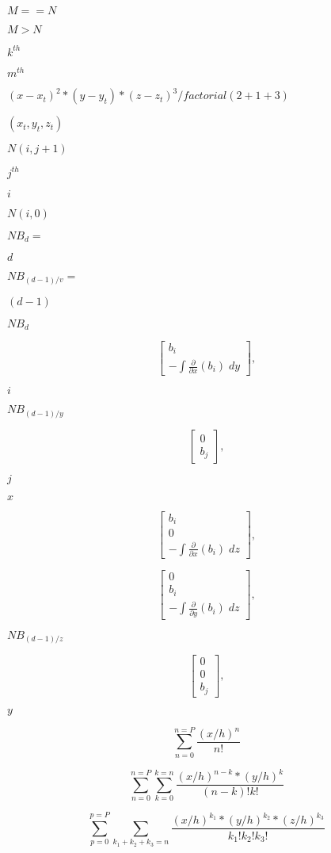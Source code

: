 \documentclass{article}
\begin{document}
$M==N$
\pagebreak

$M>N$
\pagebreak

$k^{th}$
\pagebreak

$m^{th}$
\pagebreak

$(x-x_t)^2*(y-y_t)*(z-z_t)^3/factorial(2+1+3)$
\pagebreak

$(x_t,y_t,z_t)$
\pagebreak

$ N(i,j+1) $
\pagebreak

$ j^{th} $
\pagebreak

$ i $
\pagebreak

$ N(i,0) $
\pagebreak

$NB_d=$
\pagebreak

$d$
\pagebreak

$NB_{(d-1)/v}=$
\pagebreak

$(d-1)$
\pagebreak

$NB_d$
\pagebreak

\[\begin{bmatrix}b_i\\ -\int \frac{\partial}{\partial x}(b_i)\; dy\end{bmatrix},\]
\pagebreak

$i$
\pagebreak

$NB_{(d-1)/y}$
\pagebreak

\[\begin{bmatrix}0\\b_j\end{bmatrix},\]
\pagebreak

$j$
\pagebreak

$x$
\pagebreak

\[\begin{bmatrix}b_i\\ 0 \\-\int \frac{\partial}{\partial x}(b_i)\; dz\end{bmatrix},\]
\pagebreak

\[\begin{bmatrix}0\\ b_i \\-\int \frac{\partial}{\partial y}(b_i)\; dz\end{bmatrix},\]
\pagebreak

$NB_{(d-1)/z}$
\pagebreak

\[\begin{bmatrix}0\\0\\b_j\end{bmatrix},\]
\pagebreak

$y$
\pagebreak

\[\sum_{n=0}^{n=P} \frac{(x/h)^n}{n!}\]
\pagebreak

\[\sum_{n=0}^{n=P} \sum_{k=0}^{k=n} \frac{(x/h)^{n-k}*(y/h)^k}{(n-k)!k!}\]
\pagebreak

\[\sum_{p=0}^{p=P} \sum_{k_1+k_2+k_3=n} \frac{(x/h)^{k_1}*(y/h)^{k_2}*(z/h)^{k_3}}{k_1!k_2!k_3!}\]
\pagebreak
\end{document}

